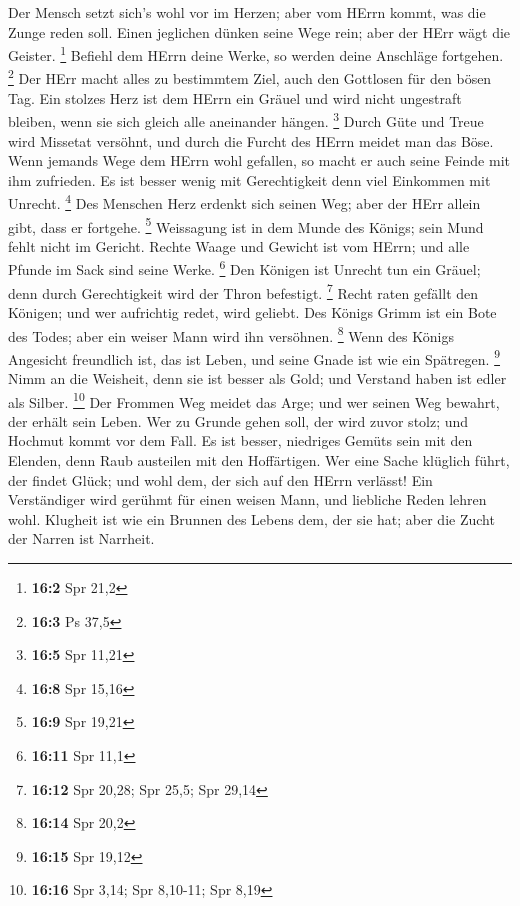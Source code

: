  Der Mensch setzt sich's wohl vor im Herzen; aber vom HErrn
kommt, was die Zunge reden soll.  Einen jeglichen dünken
seine Wege rein; aber der HErr wägt die Geister. \footnote{\textbf{16:2}
  Spr 21,2}  Befiehl dem HErrn deine Werke, so werden deine
Anschläge fortgehen. \footnote{\textbf{16:3} Ps 37,5}  Der
HErr macht alles zu bestimmtem Ziel, auch den Gottlosen für den bösen
Tag.  Ein stolzes Herz ist dem HErrn ein Gräuel und wird
nicht ungestraft bleiben, wenn sie sich gleich alle aneinander hängen.
\footnote{\textbf{16:5} Spr 11,21}  Durch Güte und Treue
wird Missetat versöhnt, und durch die Furcht des HErrn meidet man das
Böse.  Wenn jemands Wege dem HErrn wohl gefallen, so macht
er auch seine Feinde mit ihm zufrieden.  Es ist besser wenig
mit Gerechtigkeit denn viel Einkommen mit Unrecht. \footnote{\textbf{16:8}
  Spr 15,16}  Des Menschen Herz erdenkt sich seinen Weg;
aber der HErr allein gibt, dass er fortgehe. \footnote{\textbf{16:9} Spr
  19,21}  Weissagung ist in dem Munde des Königs; sein Mund
fehlt nicht im Gericht.  Rechte Waage und Gewicht ist vom
HErrn; und alle Pfunde im Sack sind seine Werke. \footnote{\textbf{16:11}
  Spr 11,1}  Den Königen ist Unrecht tun ein Gräuel; denn
durch Gerechtigkeit wird der Thron befestigt. \footnote{\textbf{16:12}
  Spr 20,28; Spr 25,5; Spr 29,14}  Recht raten gefällt den
Königen; und wer aufrichtig redet, wird geliebt.  Des
Königs Grimm ist ein Bote des Todes; aber ein weiser Mann wird ihn
versöhnen. \footnote{\textbf{16:14} Spr 20,2}  Wenn des
Königs Angesicht freundlich ist, das ist Leben, und seine Gnade ist wie
ein Spätregen. \footnote{\textbf{16:15} Spr 19,12}  Nimm an
die Weisheit, denn sie ist besser als Gold; und Verstand haben ist edler
als Silber. \footnote{\textbf{16:16} Spr 3,14; Spr 8,10-11; Spr 8,19}
 Der Frommen Weg meidet das Arge; und wer seinen Weg
bewahrt, der erhält sein Leben.  Wer zu Grunde gehen soll,
der wird zuvor stolz; und Hochmut kommt vor dem Fall.  Es
ist besser, niedriges Gemüts sein mit den Elenden, denn Raub austeilen
mit den Hoffärtigen.  Wer eine Sache klüglich führt, der
findet Glück; und wohl dem, der sich auf den HErrn verlässt!
 Ein Verständiger wird gerühmt für einen weisen Mann, und
liebliche Reden lehren wohl.  Klugheit ist wie ein Brunnen
des Lebens dem, der sie hat; aber die Zucht der Narren ist Narrheit.
